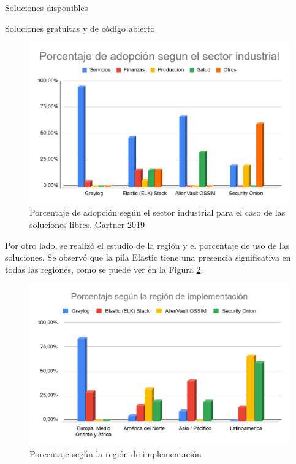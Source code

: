 \begin{section}{Soluciones disponibles}
\begin{subsection}{Soluciones gratuitas y de código abierto}
        \begin{figure}[H]
            \centering
            \includegraphics[width=1\textwidth]{./marco_teorico_imagenes/figura_13_ sol_libres_sector_ind.png}
            \caption{Porcentaje de adopción según el sector industrial para el caso de las soluciones libres. Gartner 2019 \cite{ranking}}
            \label{fig:sector_industrial_sol_libre}
        \end{figure}
        
        Por otro lado, se realizó el estudio de la región y el porcentaje de uso de las soluciones. Se observó que la pila Elastic tiene una presencia significativa en todas las regiones, como se puede ver en la Figura \ref{fig:region_implen_sol_libre}.\par
        
        \begin{figure}[H]
            \centering
            \includegraphics[width=1\textwidth]{./marco_teorico_imagenes/figura_14_region_implen_sol_libre.png}
            \caption{Porcentaje según la región de implementación}
            \label{fig:region_implen_sol_libre}
        \end{figure}
        

\end{subsection}
\end{section}
